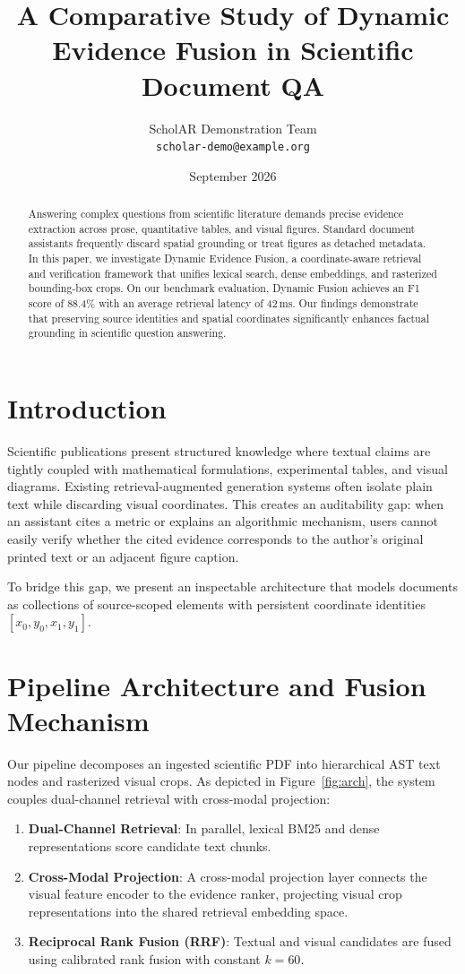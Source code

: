 \documentclass[10pt,twocolumn]{article}
\title{\textbf{A Comparative Study of Dynamic Evidence Fusion in Scientific Document QA}}
\author{ScholAR Demonstration Team \\ \texttt{scholar-demo@example.org}}
\date{September 2026}
\begin{document}
\maketitle

\begin{abstract}
Answering complex questions from scientific literature demands precise evidence extraction across prose, quantitative tables, and visual figures. Standard document assistants frequently discard spatial grounding or treat figures as detached metadata. In this paper, we investigate Dynamic Evidence Fusion, a coordinate-aware retrieval and verification framework that unifies lexical search, dense embeddings, and rasterized bounding-box crops. On our benchmark evaluation, Dynamic Fusion achieves an F1 score of 88.4\% with an average retrieval latency of 42\,ms. Our findings demonstrate that preserving source identities and spatial coordinates significantly enhances factual grounding in scientific question answering.
\end{abstract}

\section{Introduction}
Scientific publications present structured knowledge where textual claims are tightly coupled with mathematical formulations, experimental tables, and visual diagrams. Existing retrieval-augmented generation systems often isolate plain text while discarding visual coordinates. This creates an auditability gap: when an assistant cites a metric or explains an algorithmic mechanism, users cannot easily verify whether the cited evidence corresponds to the author's original printed text or an adjacent figure caption.

To bridge this gap, we present an inspectable architecture that models documents as collections of source-scoped elements with persistent coordinate identities $[x_0, y_0, x_1, y_1]$.

\section{Pipeline Architecture and Fusion Mechanism}
Our pipeline decomposes an ingested scientific PDF into hierarchical AST text nodes and rasterized visual crops. As depicted in Figure~\ref{fig:arch}, the system couples dual-channel retrieval with cross-modal projection:
\begin{enumerate}
    \item \textbf{Dual-Channel Retrieval}: In parallel, lexical BM25 and dense representations score candidate text chunks.
    \item \textbf{Cross-Modal Projection}: A cross-modal projection layer connects the visual feature encoder to the evidence ranker, projecting visual crop representations into the shared retrieval embedding space.
    \item \textbf{Reciprocal Rank Fusion (RRF)}: Textual and visual candidates are fused using calibrated rank fusion with constant $k=60$.
\end{enumerate}
\end{document}
